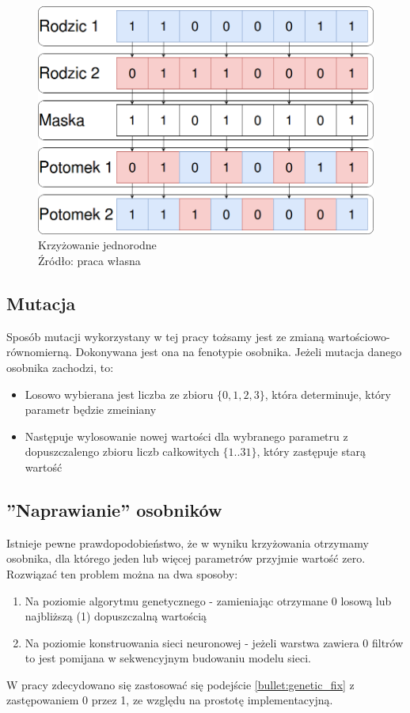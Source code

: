 \begin{figure}[h!tb]
	 \centering
	 \includegraphics[width = 1.0\linewidth]{img/crossing}
	 \caption{Krzyżowanie jednorodne \\
              Źródło: praca własna}
	 \label{fig:crossing}
\end{figure}

\subsection{Mutacja}
Sposób mutacji wykorzystany w tej pracy tożsamy jest ze zmianą wartościowo-równomierną.
Dokonywana jest ona na fenotypie osobnika.
Jeżeli mutacja danego osobnika zachodzi, to:
\begin{itemize}
  \item Losowo wybierana jest liczba ze zbioru $\lbrace 0, 1, 2, 3 \rbrace$, która determinuje, który parametr będzie zmeiniany
  \item Następuje wylosowanie nowej wartości dla wybranego parametru z dopuszczalengo zbioru liczb całkowitych $\lbrace 1..31 \rbrace$, który zastępuje starą wartość
\end{itemize}

\subsection{''Naprawianie'' osobników}\label{sec:individual_fix}
Istnieje pewne prawdopodobieństwo, że w wyniku krzyżowania otrzymamy osobnika, dla którego jeden lub więcej parametrów przyjmie wartość zero.
Rozwiązać ten problem można na dwa sposoby:
\begin{enumerate}
  \item Na poziomie algorytmu genetycznego - zamieniając otrzymane 0 losową lub najbliższą (1) dopuszczalną wartością\label{bullet:genetic_fix}
  \item Na poziomie konstruowania sieci neuronowej - jeżeli warstwa zawiera 0 filtrów to jest pomijana w sekwencyjnym budowaniu modelu sieci.
\end{enumerate}
W pracy zdecydowano się zastosować się podejście \ref{bullet:genetic_fix} z zastępowaniem 0 przez 1, ze względu na prostotę implementacyjną.

